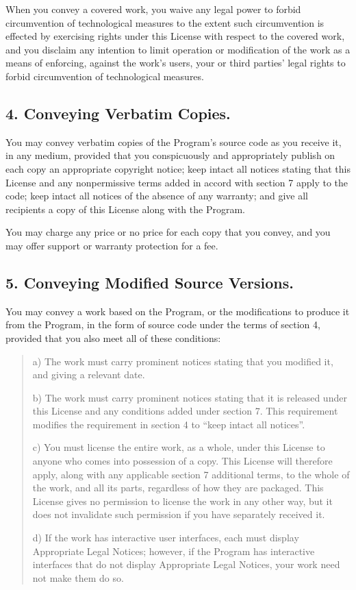 \documentclass[letterpaper,10pt,english]{sphinxmanual}
\begin{document}
\sphinxAtStartPar
When you convey a covered work, you waive any legal power to forbid
circumvention of technological measures to the extent such circumvention
is effected by exercising rights under this License with respect to
the covered work, and you disclaim any intention to limit operation or
modification of the work as a means of enforcing, against the work’s
users, your or third parties’ legal rights to forbid circumvention of
technological measures.


\subsection{4. Conveying Verbatim Copies.}
\label{\detokenize{license:conveying-verbatim-copies}}
\sphinxAtStartPar
You may convey verbatim copies of the Program’s source code as you
receive it, in any medium, provided that you conspicuously and
appropriately publish on each copy an appropriate copyright notice;
keep intact all notices stating that this License and any
non\sphinxhyphen{}permissive terms added in accord with section 7 apply to the code;
keep intact all notices of the absence of any warranty; and give all
recipients a copy of this License along with the Program.

\sphinxAtStartPar
You may charge any price or no price for each copy that you convey,
and you may offer support or warranty protection for a fee.


\subsection{5. Conveying Modified Source Versions.}
\label{\detokenize{license:conveying-modified-source-versions}}
\sphinxAtStartPar
You may convey a work based on the Program, or the modifications to
produce it from the Program, in the form of source code under the
terms of section 4, provided that you also meet all of these conditions:
\begin{quote}

\sphinxAtStartPar
a) The work must carry prominent notices stating that you modified
it, and giving a relevant date.

\sphinxAtStartPar
b) The work must carry prominent notices stating that it is
released under this License and any conditions added under section
7.  This requirement modifies the requirement in section 4 to
“keep intact all notices”.

\sphinxAtStartPar
c) You must license the entire work, as a whole, under this
License to anyone who comes into possession of a copy.  This
License will therefore apply, along with any applicable section 7
additional terms, to the whole of the work, and all its parts,
regardless of how they are packaged.  This License gives no
permission to license the work in any other way, but it does not
invalidate such permission if you have separately received it.

\sphinxAtStartPar
d) If the work has interactive user interfaces, each must display
Appropriate Legal Notices; however, if the Program has interactive
interfaces that do not display Appropriate Legal Notices, your
work need not make them do so.
\end{quote}
\end{document}
